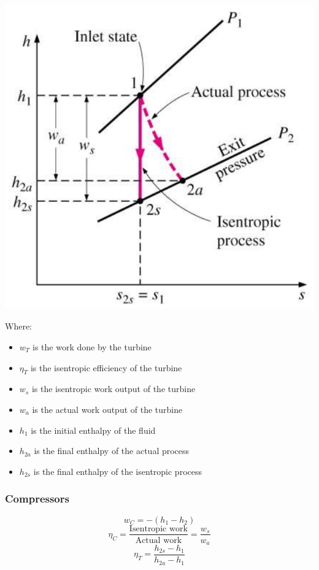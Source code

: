 \documentclass[11pt]{article}
\begin{document}
\begin{center}
\includegraphics[scale=0.75]{./images/isentropic-efficiency-of-turbines.png}
\end{center}

Where:
\begin{itemize}
\item \(w_T\) is the work done by the turbine
\item \(\eta_T\) is the isentropic efficiency of the turbine
\item \(w_s\) is the isentropic work output of the turbine
\item \(w_a\) is the actual work output of the turbine
\item \(h_1\) is the initial enthalpy of the fluid
\item \(h_{2a}\) is the final enthalpy of the actual process
\item \(h_{2s}\) is the final enthalpy of the isentropic process
\end{itemize}

\subsubsection{Compressors}
\label{sec:orga188627}
\[w_C = -(h_1 - h_2)\]
\[\eta_C = \frac{\text{Isentropic work}}{\text{Actual work}} = \frac{w_s}{w_a}\]
\[\eta_T = \frac{h_{2s} - h_1}{h_{2a} - h_1}\]
\end{document}
